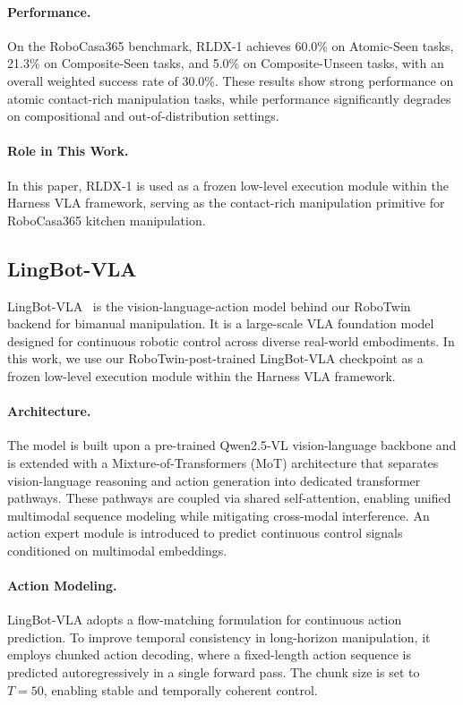 \documentclass[11pt]{article}
\begin{document}
\paragraph{Performance.}
On the RoboCasa365 benchmark, RLDX-1 achieves 60.0\% on Atomic-Seen tasks, 21.3\% on Composite-Seen tasks, and 5.0\% on Composite-Unseen tasks, with an overall weighted success rate of 30.0\%. These results show strong performance on atomic contact-rich manipulation tasks, while performance significantly degrades on compositional and out-of-distribution settings.

\paragraph{Role in This Work.}
In this paper, RLDX-1 is used as a frozen low-level execution module within the Harness VLA framework, serving as the contact-rich manipulation primitive for RoboCasa365 kitchen manipulation.

\subsection{LingBot-VLA}

LingBot-VLA~\citep{wu2026pragmatic} is the vision-language-action model behind our RoboTwin backend for bimanual manipulation. It is a large-scale VLA foundation model designed for continuous robotic control across diverse real-world embodiments. In this work, we use our RoboTwin-post-trained LingBot-VLA checkpoint as a frozen low-level execution module within the Harness VLA framework.

\paragraph{Architecture.}
The model is built upon a pre-trained Qwen2.5-VL vision-language backbone and is extended with a Mixture-of-Transformers (MoT) architecture that separates vision-language reasoning and action generation into dedicated transformer pathways. These pathways are coupled via shared self-attention, enabling unified multimodal sequence modeling while mitigating cross-modal interference. An action expert module is introduced to predict continuous control signals conditioned on multimodal embeddings.

\paragraph{Action Modeling.}
LingBot-VLA adopts a flow-matching formulation for continuous action prediction. To improve temporal consistency in long-horizon manipulation, it employs chunked action decoding, where a fixed-length action sequence is predicted autoregressively in a single forward pass. The chunk size is set to $T = 50$, enabling stable and temporally coherent control.
\end{document}
